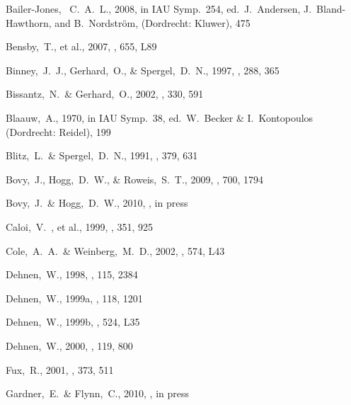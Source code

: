 \documentclass[12pt,preprint]{aastex}
\newcommand{\etal}{et al.}
\begin{document}
\begin{thebibliography}{}


  Bailer-Jones, ~C.~A.~L., 2008,
  in IAU Symp.~254, ed.~J.~Andersen, J.~Bland-Hawthorn, and B.~Nordstr\"{o}m, (Dordrecht: Kluwer), 475  

\bibitem[Bensby \etal(2007)]{Bensby07a}
  Bensby,~T., \etal, 2007,
  \apjl, 655, L89

  Binney,~J.~J., Gerhard,~O., \& Spergel,~D.~N., 1997,
  \mnras, 288, 365

  Bissantz,~N.~\& Gerhard,~O., 2002,
  \mnras, 330, 591

  Blaauw,~A., 1970, in IAU Symp.~38, ed.~W.~Becker \& I.~Kontopoulos (Dordrecht: Reidel), 199

  Blitz,~L.~\& Spergel,~D.~N., 1991, \apj, 379, 631

 Bovy,~J., Hogg,~D.~W., \& Roweis,~S.~T., 2009,
  \apj, 700, 1794

 Bovy,~J.~\& Hogg,~D.~W., 2010,
  \apj, in press

\bibitem[Caloi \etal(1999)]{caloi99a}
  Caloi,~V.~, \etal, 1999,
  \aap, 351, 925

  Cole,~A.~A.~\& Weinberg,~M.~D., 2002,
  \apjl, 574, L43

Dehnen,~W., 1998, \aj, 115, 2384


  Dehnen,~W., 1999a, \aj, 118, 1201

  Dehnen,~W., 1999b, \apj, 524, L35

  Dehnen,~W., 2000, \aj, 119, 800

  Fux,~R., 2001,
  \aap, 373, 511

  Gardner,~E.~\& Flynn,~C., 2010,
  \mnras, in press


\end{thebibliography}
\end{document}
